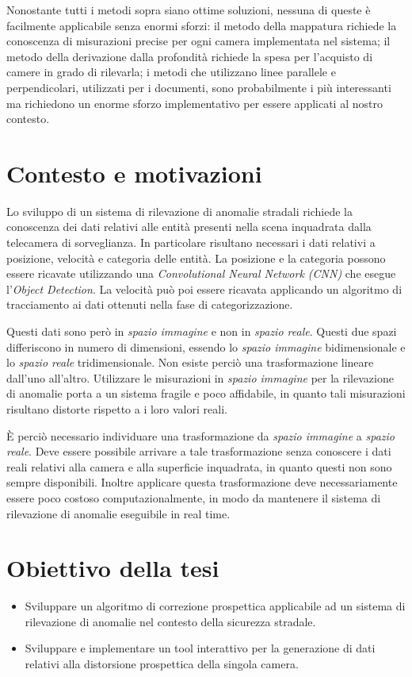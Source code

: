 Nonostante tutti i metodi sopra siano ottime soluzioni, nessuna di queste è facilmente applicabile senza enormi sforzi: il metodo della mappatura richiede la conoscenza di misurazioni precise per ogni camera implementata nel sistema; il metodo della derivazione dalla profondità richiede la spesa per l'acquisto di camere in grado di rilevarla; i metodi che utilizzano linee parallele e perpendicolari, utilizzati per i documenti, sono probabilmente i più interessanti ma richiedono un enorme sforzo implementativo per essere applicati al nostro contesto.

\section{Contesto e motivazioni}

Lo sviluppo di un sistema di rilevazione di anomalie stradali richiede la conoscenza dei dati relativi alle entità presenti nella scena inquadrata dalla telecamera di sorveglianza.
In particolare risultano necessari i dati relativi a posizione, velocità e categoria delle entità.
La posizione e la categoria possono essere ricavate utilizzando una \emph{Convolutional Neural Network (CNN)} che esegue l'\emph{Object Detection}.
La velocità può poi essere ricavata applicando un algoritmo di tracciamento ai dati ottenuti nella fase di categorizzazione.

Questi dati sono però in \emph{spazio immagine} e non in \emph{spazio reale}.
Questi due spazi differiscono in numero di dimensioni, essendo lo \emph{spazio immagine} bidimensionale e lo \emph{spazio reale} tridimensionale.
Non esiste perciò una trasformazione lineare dall'uno all'altro.
Utilizzare le misurazioni in \emph{spazio immagine} per la rilevazione di anomalie porta a un sistema fragile e poco affidabile, in quanto tali misurazioni risultano distorte rispetto a i loro valori reali.

È perciò necessario individuare una trasformazione da \emph{spazio immagine} a \emph{spazio reale}.
Deve essere possibile arrivare a tale trasformazione senza conoscere i dati reali relativi alla camera e alla superficie inquadrata, in quanto questi non sono sempre disponibili.
Inoltre applicare questa trasformazione deve necessariamente essere poco costoso computazionalmente, in modo da mantenere il sistema di rilevazione di anomalie eseguibile in real time.

\section{Obiettivo della tesi}
\begin{itemize}
	\item Sviluppare un algoritmo di correzione prospettica applicabile ad un sistema di rilevazione di anomalie nel contesto della sicurezza stradale.
	\item Sviluppare e implementare un tool interattivo per la generazione di dati relativi alla distorsione prospettica della singola camera.
\end{itemize}

